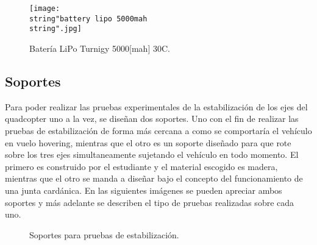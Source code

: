 \documentclass[../main.tex]{subfiles}
\begin{document}
\begin{figure}[H]
\noindent \begin{centering}
\texttt{[image: \\string"battery lipo 5000mah\\string".jpg]}
\par\end{centering}
\caption{Batería LiPo Turnigy 5000{[}mah{]} 30C.}
\end{figure}

\textcompwordmark{}

\subsection{Soportes}

Para poder realizar las pruebas experimentales de la estabilización
de los ejes del quadcopter uno a la vez, se diseñan dos soportes.
Uno con el fin de realizar las pruebas de estabilización de forma
más cercana a como se comportaría el vehículo en vuelo hovering, mientras
que el otro es un soporte diseñado para que rote sobre los tres ejes
simultaneamente sujetando el vehículo en todo momento. El primero
es construido por el estudiante y el material escogido es madera,
mientras que el otro se manda a diseñar bajo el concepto del funcionamiento
de una junta cardánica. En las siguientes imágenes se pueden apreciar
ambos soportes y más adelante se describen el tipo de pruebas realizadas
sobre cada uno. 

\begin{figure}[H]
\noindent \begin{centering}
\par\end{centering}
\caption{Soportes para pruebas de estabilización.}\label{Soporte de Maderita}\noindent
\end{figure}
\end{document}
